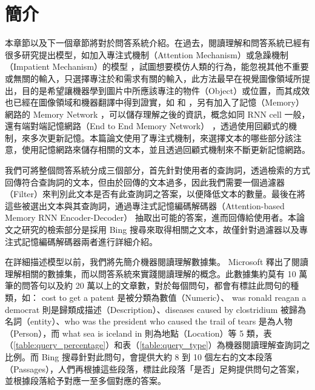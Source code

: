\section{簡介}
本章節以及下一個章節將對於問答系統介紹。在過去，閱讀理解和問答系統已經有很多研究提出模型，如加入專注式機制（Attention Mechanism）或急躁機制（Impatient Mechanism）的模型 \cite{hermann2015teaching} ，試圖想要模仿人類的行為，能忽視其他不重要或無關的輸入，只選擇專注於和需求有關的輸入，此方法最早在視覺圖像領域所提出，目的是希望讓機器學到圖片中所應該專注的物件（Object）或位置，而其成效也已經在圖像領域和機器翻譯中得到證實，如 \cite{mnih2014recurrent} 和 \cite{bahdanau2014neural}，另有加入了記憶（Memory）網路的 Memory Network \cite{weston2014memory} ，可以儲存理解之後的資訊，概念如同 RNN cell 一般，還有端對端記憶網路（End to End Memory Network）\cite{sukhbaatar2015end} ，透過使用回顧式的機制，來多次更新記憶。本篇論文使用了專注式機制，來選擇文本的哪些部分該注意，使用記憶網路來儲存相關的文本，並且透過回顧式機制來不斷更新記憶網路。

我們可將整個問答系統分成三個部分，首先針對使用者的查詢詞，透過檢索的方式回傳符合查詢詞的文本，但由於回傳的文本過多，因此我們需要一個過濾器（Filter）來判別此文本是否有此查詢詞之答案，以便降低文本的數量。最後在將這些被選出文本與其查詢詞，通過專注式記憶編碼解碼器（Attention-based Memory RNN Encoder-Decoder）\cite{xiong2016dynamic} 抽取出可能的答案，進而回傳給使用者。本論文之研究的檢索部分是採用 Bing 搜尋來取得相關之文本，故僅針對過濾器以及專注式記憶編碼解碼器兩者進行詳細介紹。

在詳細描述模型以前，我們將先簡介機器閱讀理解數據集。 Microsoft 釋出了閱讀理解相關的數據集，而以問答系統來實踐閱讀理解的概念。此數據集約莫有 10 萬筆的問答句以及約 20 萬以上的文章數，對於每個問句，都會有標註此問句的種類，如： cost to get a patent 是被分類為數值（Numeric）、 was ronald reagan a democrat 則是歸類成描述（Description）、diseases caused by clostridium 被歸為名詞（entity）、who was the president who caused the trail of tears 是為人物（Person），而 what sea is iceland in 則為地點（Location）等 5 類，表（\ref{table:query_percentage}）和表（\ref{table:query_type}）為機器閱讀理解查詢詞之比例。而 Bing 搜尋針對此問句，會提供大約 8 到 10 個左右的文本段落（Passages），人們再根據這些段落，標註此段落「是否」足夠提供問句之答案，並根據段落給予對應一至多個對應的答案。

